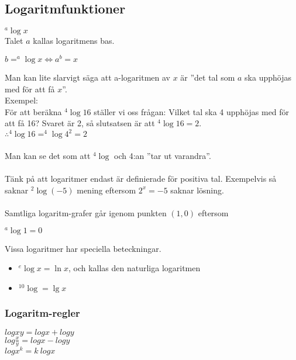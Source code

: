 \documentclass[11pt]{article}
\begin{document}
\subsection{Logaritmfunktioner}
{\Large $^a\log x$} \\
Talet $a$ kallas logaritmens bas. 
\begin{center}
$b = ^a\log x \Leftrightarrow a^b = x$
\end{center}
Man kan lite slarvigt säga att a-logaritmen av $x$ är ''det tal som $a$ ska upphöjas med för att få $x$''. \\ 
Exempel:  \\
För att beräkna $^4\log16$ ställer vi oss frågan: Vilket tal ska 4 upphöjas med för att få 16? Svaret är 2, så slutsatsen är att $^4\log16=2$. \\
$\therefore ^4\log16 = ^4\log4^2 = 2$ \\ \\
Man kan se det som att $^4\log $ och 4:an ''tar ut varandra''. \\ \\
Tänk på att logaritmer endast är definierade för positiva tal. Exempelvis så saknar $^2\log(-5)$ mening eftersom $2^x = -5$ saknar lösning. \\ \\
Samtliga logaritm-grafer går igenom punkten $(1,0)$ eftersom
\begin{center}
$^a\log 1 = 0$
\end{center}
Vissa logaritmer har speciella beteckningar. 
\begin{itemize}
\item{$^e \log x = \ln x$, och kallas den naturliga logaritmen}
\item{$^{10}\log = \lg x$}
\end{itemize}
\subsubsection{Logaritm-regler} 
\begin{center}
$ logxy = logx + logy$ \\
$ log\frac{x}{y} = logx - logy $ \\
$ logx^k = k~logx $
\end{center}
\end{document}
